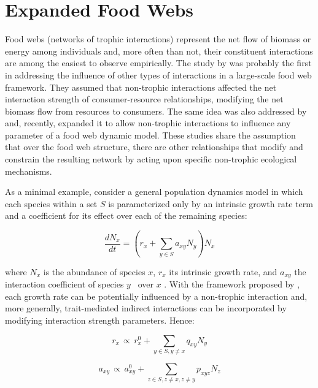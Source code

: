 \section{Expanded Food Webs}
Food webs (networks of trophic interactions) represent the net flow of biomass or energy among individuals \citep{Lindeman1942, Paine1966, Pimm1982, Moore2012} and, more often than not, their constituent interactions are among the easiest to observe empirically. The study by \cite{Arditi2005} was probably the first in addressing the influence of other types of interactions in a large-scale food web framework. They assumed that non-trophic interactions affected the net interaction strength of consumer-resource relationships, modifying the net biomass flow from resources to consumers. The same idea was also addressed by \cite{Goudard2008} and, recently, \cite{Kefi2012} expanded it to allow non-trophic interactions to influence any parameter of a food web dynamic model. These studies share the assumption that over the food web structure, there are other relationships that modify and constrain the resulting network by acting upon specific non-trophic ecological mechanisms.

As a minimal example, consider a general population dynamics model in which each species within a set $S$ is parameterized only by an intrinsic growth rate term and a coefficient for its effect over each of the remaining species:

\begin{equation} \label{eq:2.1}
\frac{\mathit{dN}_x}{\mathit{dt}}=\left(r_x+\sum _{y{\in}S}a_{\mathit{xy}}N_y\right)N_x
\end{equation}


where  $N_x$  is the abundance of species  $x$,  $r_x$  its intrinsic growth rate, and  $a_{\mathit{xy}}$  the interaction coefficient of species  $y$  \ over  $x$  . With the framework proposed by \cite{Kefi2012}, each growth rate can be potentially influenced by a non-trophic interaction and, more generally, trait-mediated indirect interactions \citep{Peacor1997} can be incorporated by modifying interaction strength parameters. Hence:

\begin{equation} \label{eq:2.2}
r_x\, {\propto}\, r_x^0+\sum _{y{\in}S,y{\neq}x}q_{\mathit{xy}}N_y
\end{equation}

\begin{equation} \label{eq:2.3}
a_{\mathit{xy}}\, {\propto}\, a_{\mathit{xy}}^0+\sum _{z{\in}S,z{\neq}x,z{\neq}y}p_{\mathit{xyz}}N_z
\end{equation}

